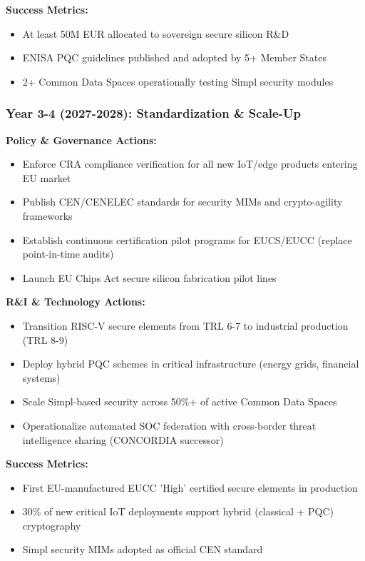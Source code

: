 \documentclass{ieeeaccess}
\begin{document}
\textbf{Success Metrics:}
\begin{itemize}
    \item At least 50M EUR allocated to sovereign secure silicon R\&D
    \item ENISA PQC guidelines published and adopted by 5+ Member States
    \item 2+ Common Data Spaces operationally testing Simpl security modules
\end{itemize}

\subsubsection*{Year 3-4 (2027-2028): Standardization \& Scale-Up}
\textbf{Policy \& Governance Actions:}
\begin{itemize}
    \item Enforce CRA compliance verification for all new IoT/edge products entering EU market
    \item Publish CEN/CENELEC standards for security MIMs and crypto-agility frameworks
    \item Establish continuous certification pilot programs for EUCS/EUCC (replace point-in-time audits)
    \item Launch EU Chips Act secure silicon fabrication pilot lines
\end{itemize}

\textbf{R\&I \& Technology Actions:}
\begin{itemize}
    \item Transition RISC-V secure elements from TRL 6-7 to industrial production (TRL 8-9)
    \item Deploy hybrid PQC schemes in critical infrastructure (energy grids, financial systems)
    \item Scale Simpl-based security across 50\%+ of active Common Data Spaces
    \item Operationalize automated SOC federation with cross-border threat intelligence sharing (CONCORDIA successor)
\end{itemize}

\textbf{Success Metrics:}
\begin{itemize}
    \item First EU-manufactured EUCC 'High' certified secure elements in production
    \item 30\% of new critical IoT deployments support hybrid (classical + PQC) cryptography
    \item Simpl security MIMs adopted as official CEN standard
\end{itemize}
\end{document}
